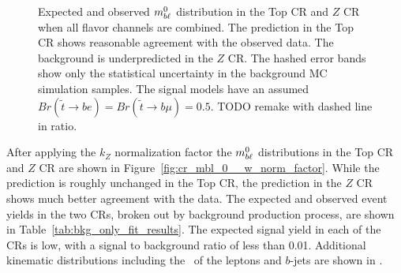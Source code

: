 \begin{figure}
  \centering
  \caption{
    Expected and observed $m_{b\ell}^0$ distribution in the Top CR and
    $Z$ CR when all flavor channels are combined.
    The prediction in the Top CR shows reasonable agreement with the observed
    data.
    The background is underpredicted in the $Z$ CR.
    The hashed error bands show only the statistical uncertainty in the
    background MC simulation samples.
    The signal models have an assumed
    $Br(\tilde{t}\rightarrow be) = Br(\tilde{t}\rightarrow b\mu) = 0.5$.
    {\color{red} TODO remake with dashed line in ratio.}
  }
  \label{fig:cr_mbl_0__no_norm_factor}
\end{figure}

After applying the $k_Z$ normalization factor the $m_{b\ell}^0$ distributions in
the Top CR and $Z$ CR are shown in Figure~\ref{fig:cr_mbl_0__w_norm_factor}.
While the prediction is roughly unchanged in the Top CR, the prediction in the
$Z$ CR shows much better agreement with the data.
The expected and observed event yields in the two CRs, broken out by background
production process, are shown in Table~\ref{tab:bkg_only_fit_results}.
The expected signal yield in each of the CRs is low, with a signal to
background ratio of less than 0.01.
Additional kinematic distributions including the \pt\ of the leptons and
$b$-jets are shown in
.

